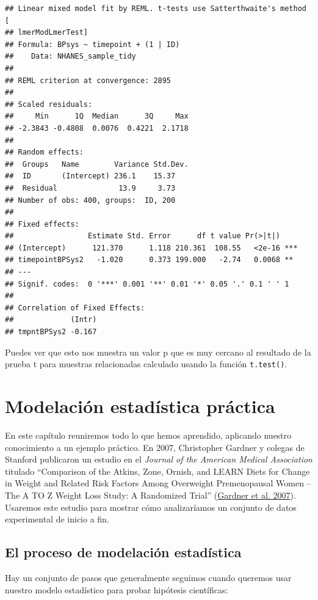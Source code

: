 \documentclass[
  12pt,
]{book}
\begin{document}
\begin{verbatim}
## Linear mixed model fit by REML. t-tests use Satterthwaite's method [
## lmerModLmerTest]
## Formula: BPsys ~ timepoint + (1 | ID)
##    Data: NHANES_sample_tidy
## 
## REML criterion at convergence: 2895
## 
## Scaled residuals: 
##     Min      1Q  Median      3Q     Max 
## -2.3843 -0.4808  0.0076  0.4221  2.1718 
## 
## Random effects:
##  Groups   Name        Variance Std.Dev.
##  ID       (Intercept) 236.1    15.37   
##  Residual              13.9     3.73   
## Number of obs: 400, groups:  ID, 200
## 
## Fixed effects:
##                 Estimate Std. Error      df t value Pr(>|t|)    
## (Intercept)      121.370      1.118 210.361  108.55   <2e-16 ***
## timepointBPSys2   -1.020      0.373 199.000   -2.74   0.0068 ** 
## ---
## Signif. codes:  0 '***' 0.001 '**' 0.01 '*' 0.05 '.' 0.1 ' ' 1
## 
## Correlation of Fixed Effects:
##             (Intr)
## tmpntBPSys2 -0.167
\end{verbatim}

Puedes ver que esto nos muestra un valor p que es muy cercano al resultado de la prueba t para muestras relacionadas calculado usando la función \texttt{t.test()}.

\hypertarget{practical-example}{%
\chapter{Modelación estadística práctica}\label{practical-example}}

En este capítulo reuniremos todo lo que hemos aprendido, aplicando nuestro conocimiento a un ejemplo práctico. En 2007, Christopher Gardner y colegas de Stanford publicaron un estudio en el \emph{Journal of the American Medical Association} titulado ``Comparison of the Atkins, Zone, Ornish, and LEARN Diets for Change in Weight and Related Risk Factors Among Overweight Premenopausal Women -- The A TO Z Weight Loss Study: A Randomized Trial'' (\protect\hyperlink{ref-gard:kiaz:alha:2007}{Gardner et al. 2007}). Usaremos este estudio para mostrar cómo analizaríamos un conjunto de datos experimental de inicio a fin.

\hypertarget{el-proceso-de-modelaciuxf3n-estaduxedstica}{%
\section{El proceso de modelación estadística}\label{el-proceso-de-modelaciuxf3n-estaduxedstica}}

Hay un conjunto de pasos que generalmente seguimos cuando queremos usar nuestro modelo estadístico para probar hipótesis científicas:
\end{document}
